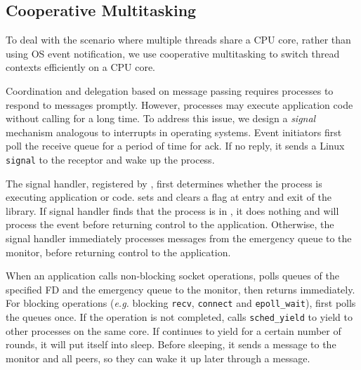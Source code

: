 \subsection{Cooperative Multitasking}
\label{subsec:process-mux}

To deal with the scenario where multiple threads share a CPU core, rather than using OS event notification, we use cooperative multitasking to switch thread contexts efficiently on a CPU core.


Coordination and delegation based on message passing requires processes to respond to messages promptly. However, processes may execute application code without calling \libipc{} for a long time. To address this issue, we design a \textit{signal} mechanism analogous to interrupts in operating systems. Event initiators  first poll the receive queue for a period of time for ack. If no reply, it sends a Linux \texttt{signal} to the receptor and wake up the process.

The signal handler, registered by \libipc{}, first determines whether the process is executing application or \libipc{} code. \libipc{} sets and clears a flag at entry and exit of the library. If signal handler finds that the process is in \libipc, it does nothing and \libipc{} will process the event before returning control to the application. Otherwise, the signal handler immediately processes messages from the emergency queue to the monitor, before returning control to the application. 

When an application calls non-blocking socket operations, \libipc{} polls queues of the specified FD and the emergency queue to the monitor, then returns immediately. For blocking operations (\textit{e.g.} blocking \texttt{recv}, \texttt{connect} and \texttt{epoll\_wait}), \libipc{} first polls the queues once. If the operation is not completed, \libipc{} calls \texttt{sched\_yield} to yield to other processes on the same core. %
If \libipc{} continues to yield for a certain number of rounds, it will put itself into sleep. Before sleeping, it sends a message to the monitor and all peers, so they can wake it up later through a message.

